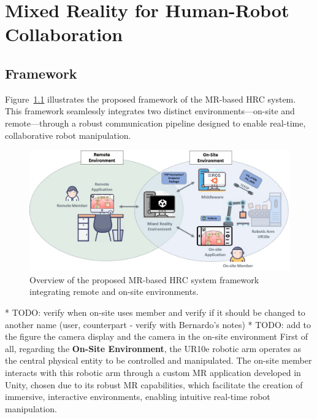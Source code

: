 \chapter{Mixed Reality for Human-Robot Collaboration}%
\label{chapter:on-site}


\section{Framework}

Figure~\ref{fig:project_framework} illustrates the proposed framework of the \ac{MR}-based \ac{HRC} system. This framework seamlessly integrates two distinct environments—on-site and remote—through a robust communication pipeline designed to enable real-time, collaborative robot manipulation.

\begin{figure}[h]
    \centering
    \includegraphics[width=\linewidth]{figs/framework-1.jpeg}
    \caption{Overview of the proposed \ac{MR}-based \ac{HRC} system framework integrating remote and on-site environments.}
    \label{fig:project_framework}
\end{figure}
* TODO: verify when on-site uses member and verify if it should be changed to another name (user, counterpart - verify with Bernardo's notes)
* TODO: add to the figure the camera display and the camera in the on-site environment 
First of all, regarding the \textbf{On-Site Environment}, the UR10e robotic arm operates as the central physical entity to be controlled and manipulated. The on-site member interacts with this robotic arm through a custom \ac{MR} application developed in Unity, chosen due to its robust \ac{MR} capabilities, which facilitate the creation of immersive, interactive environments, enabling intuitive real-time robot manipulation.

